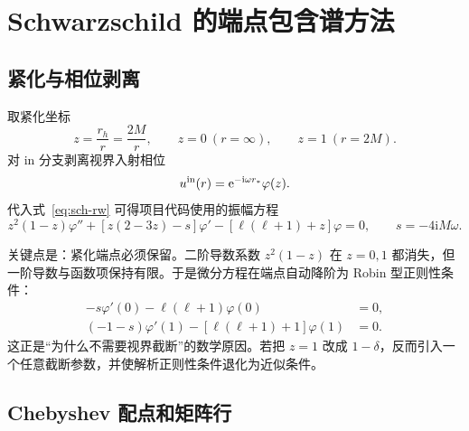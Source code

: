 \documentclass[UTF8,fontset=fandol,11pt,a4paper,oneside]{ctexart}
\numberwithin{equation}{section}
\newcommand{\ii}{\mathrm i}
\newcommand{\ee}{\mathrm e}
\begin{document}
\section{Schwarzschild 的端点包含谱方法}
\label{sec:sch-spectral}

\subsection{紧化与相位剥离}

取紧化坐标
\begin{equation}
z=\frac{r_h}{r}=\frac{2M}{r},\qquad
z=0\ (r=\infty),\qquad z=1\ (r=2M).
\end{equation}
对 in 分支剥离视界入射相位
\begin{equation}
u^{\rm in}(r)=\ee^{-\ii\omega r_*}\varphi(z).
\end{equation}
代入式~\eqref{eq:sch-rw} 可得项目代码使用的振幅方程
\begin{equation}
z^2(1-z)\varphi''+
\left[z(2-3z)-s\right]\varphi'
-\left[\ell(\ell+1)+z\right]\varphi=0,
\qquad s=-4\ii M\omega.
\label{eq:sch-peeled}
\end{equation}

关键点是：紧化端点必须保留。二阶导数系数 $z^2(1-z)$ 在 $z=0,\allowbreak 1$ 都消失，但一阶导数与函数项保持有限。于是微分方程在端点自动降阶为 Robin 型正则性条件：
\begin{align}
-s\varphi'(0)-\ell(\ell+1)\varphi(0)&=0,
\label{eq:sch-inf-row}\\
(-1-s)\varphi'(1)-[\ell(\ell+1)+1]\varphi(1)&=0.
\label{eq:sch-h-row}
\end{align}
这正是“为什么不需要视界截断”的数学原因。若把 $z=1$ 改成 $1-\delta$，反而引入一个任意截断参数，并使解析正则性条件退化为近似条件。

\subsection{Chebyshev 配点和矩阵行}
\end{document}
